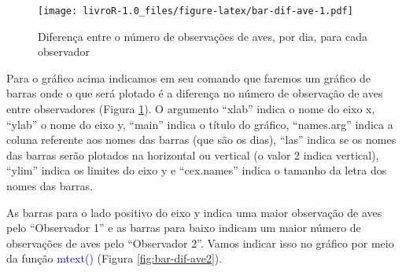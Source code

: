 \documentclass[titlepage, oneside, openany, a4paper]{book}
\newenvironment{Shaded}{\begin{snugshade}}{\end{snugshade}}
\newcommand{\DataTypeTok}[1]{\textcolor[rgb]{0.13,0.29,0.53}{#1}}
\newcommand{\DecValTok}[1]{\textcolor[rgb]{0.00,0.00,0.81}{#1}}
\newcommand{\FloatTok}[1]{\textcolor[rgb]{0.00,0.00,0.81}{#1}}
\newcommand{\KeywordTok}[1]{\textcolor[rgb]{0.13,0.29,0.53}{\textbf{#1}}}
\newcommand{\NormalTok}[1]{#1}
\newcommand{\OperatorTok}[1]{\textcolor[rgb]{0.81,0.36,0.00}{\textbf{#1}}}
\newcommand{\StringTok}[1]{\textcolor[rgb]{0.31,0.60,0.02}{#1}}
\begin{document}
\begin{figure}
\centering
\texttt{[image: livroR-1.0\_files/figure-latex/bar-dif-ave-1.pdf]}
\caption{\label{fig:bar-dif-ave}Diferença entre o número de observações de aves, por dia, para cada observador}
\end{figure}

Para o gráfico acima indicamos em seu comando que faremos um gráfico de barras onde o que será plotado é a diferença no número de observação de aves entre observadores (Figura \ref{fig:bar-dif-ave}). O argumento ``xlab'' indica o nome do eixo x, ``ylab'' o nome do eixo y, ``main'' indica o título do gráfico, ``names.arg'' indica a coluna referente aos nomes das barras (que são os dias), ``las'' indica se os nomes das barras serão plotados na horizontal ou vertical (o valor 2 indica vertical), ``ylim'' indica os limites do eixo y e ``cex.names'' indica o tamanho da letra dos nomes das barras.

As barras para o lado positivo do eixo y indica uma maior observação de aves pelo ``Observador 1'' e as barras para baixo indicam um maior número de observações de aves pelo ``Observador 2''. Vamos indicar isso no gráfico por meio da função \textcolor{blue}{mtext()} (Figura \ref{fig:bar-dif-ave2}).

\begin{Shaded}
\end{Shaded}
\end{document}
